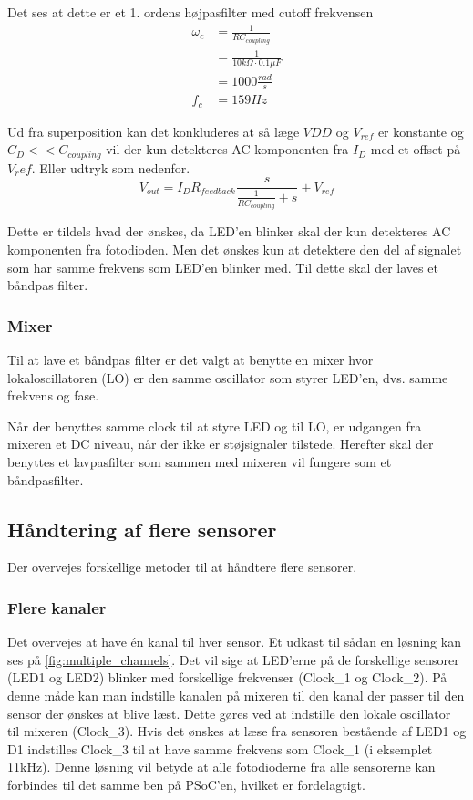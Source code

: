 \documentclass[HardwareDesign/HardwareDesign_main.tex]{subfiles}
\begin{document}
Det ses at dette er et 1. ordens højpasfilter med cutoff frekvensen 
\begin{align}
\omega_c &= \frac{1}{RC_{coupling} }\\
&= \frac{1}{10\si{k\Omega} \cdot 0.1\si{\mu F}}\\
&= 1000 \si{\frac{rad}{s}}\\
f_c &= 159 \si{Hz}
\end{align}

Ud fra superposition kan det konkluderes at så læge $VDD$ og $V_{ref}$ er konstante og $C_D << C_{coupling}$ vil der kun detekteres AC komponenten fra $I_D$ med et offset på $V_ref$. Eller udtryk som nedenfor.
$$V_{out} = I_D R_{feedback} \frac{s}{\frac{1}{R C_{coupling}} + s} + V_{ref}$$

Dette er tildels hvad der ønskes, da LED'en blinker skal der kun detekteres AC komponenten fra fotodioden. Men det ønskes kun at detektere den del af signalet som har samme frekvens som LED'en blinker med. Til dette skal der laves et båndpas filter.

\subsubsection{Mixer} \label{sec:CupSensorMixer}
Til at lave et båndpas filter er det valgt at benytte en mixer hvor lokaloscillatoren (LO) er den samme oscillator som styrer LED'en, dvs. samme frekvens og fase. 

Når der benyttes samme clock til at styre LED og til LO, er udgangen fra mixeren et DC niveau, når der ikke er støjsignaler tilstede. Herefter skal der benyttes et lavpasfilter som sammen med mixeren vil fungere som et båndpasfilter.

\newpage
\subsection{Håndtering af flere sensorer}

Der overvejes forskellige metoder til at håndtere flere sensorer.
\subsubsection{Flere kanaler}
Det overvejes at have én kanal til hver sensor. Et udkast til sådan en løsning kan ses på \ref{fig:multiple_channels}. Det vil sige at LED'erne på de forskellige sensorer (LED1 og LED2) blinker med forskellige frekvenser (Clock\_1 og Clock\_2). På denne måde kan man indstille kanalen på mixeren til den kanal der passer til den sensor der ønskes at blive læst. Dette gøres ved at indstille den lokale oscillator til mixeren (Clock\_3). Hvis det ønskes at læse fra sensoren bestående af LED1 og D1 indstilles Clock\_3 til at have samme frekvens som Clock\_1 (i eksemplet 11kHz). Denne løsning vil betyde at alle fotodioderne fra alle sensorerne kan forbindes til det samme ben på PSoC'en, hvilket er fordelagtigt.
\end{document}
